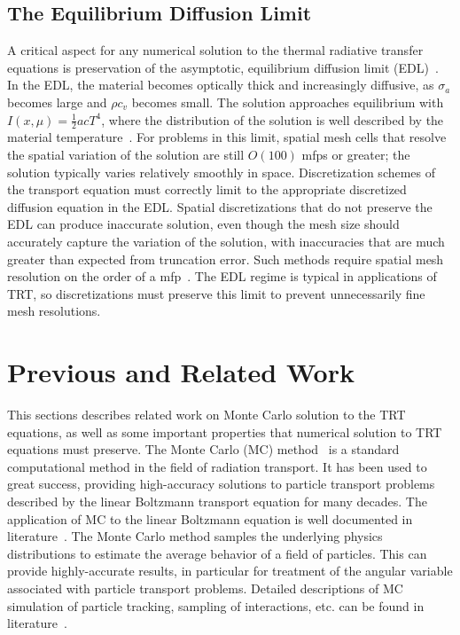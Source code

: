 \subsection{The Equilibrium Diffusion Limit}

A critical aspect for any numerical solution to the thermal radiative transfer equations
is preservation of the asymptotic, equilibrium diffusion limit (EDL)~\cite{morel_ldtrt,larsen_edl}.
In the EDL, the material becomes optically thick and increasingly diffusive, as $\sigma_a$ becomes large and
$\rho c_v$ becomes small.  The solution approaches equilibrium with $I(x,\mu)=\frac{1}{2}acT^4$,
where the distribution of the solution is well described by the material
temperature~\cite{larsen_edl}.  For problems in this limit, spatial mesh cells that resolve the spatial variation of the solution are
still $O(100)$ mfps or greater; the solution typically varies relatively smoothly in space.
Discretization schemes of the transport equation must correctly limit to the appropriate
discretized diffusion equation in the EDL.  Spatial discretizations that do not preserve
the EDL can produce inaccurate solution, even though the mesh size should accurately capture the variation of the solution, with
inaccuracies that are much greater than expected from truncation error.  Such methods
require spatial mesh resolution on the order of a mfp~\cite{morel_ldtrt}.  The EDL regime is typical in
applications of TRT, so discretizations must preserve this limit to prevent unnecessarily
fine mesh resolutions.

\section{Previous and Related Work}

This sections describes related work on Monte Carlo solution to the TRT equations, as well
as some important properties that numerical solution to TRT equations must preserve.  
The Monte Carlo (MC) method~\cite{shultis_mc} is a standard computational method in
the field of radiation transport.  It has been used to great success, providing high-accuracy
solutions to particle
transport problems described by the linear Boltzmann transport equation for many decades.  The application of MC to the linear Boltzmann
equation is well documented in
literature~\cite{mcnp,shultis_mc,lewis}.  The Monte Carlo method samples the underlying physics distributions to estimate the
average behavior of a field of particles.  This can provide highly-accurate results, in
particular for treatment of the angular variable associated with particle transport
problems.  Detailed descriptions of MC simulation of particle tracking, sampling of
interactions, etc. can be found in literature~\cite{mcnp,wollaber_review,shultis_mc}.

